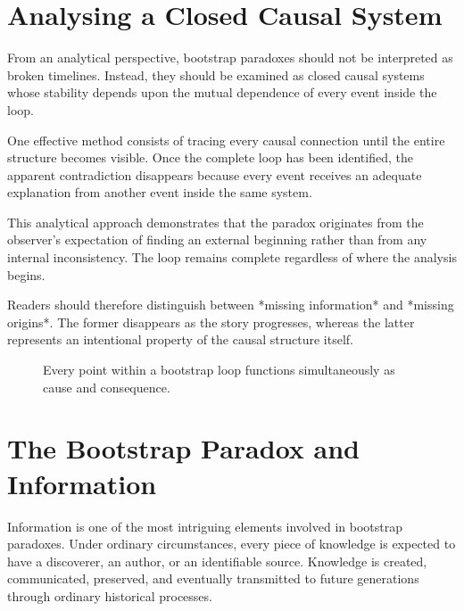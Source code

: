 \documentclass[12pt,oneside,openany]{book}
\begin{document}
\section{Analysing a Closed Causal System}

From an analytical perspective, bootstrap paradoxes should not be interpreted
as broken timelines. Instead, they should be examined as closed causal systems
whose stability depends upon the mutual dependence of every event inside the
loop.

One effective method consists of tracing every causal connection until the
entire structure becomes visible. Once the complete loop has been identified,
the apparent contradiction disappears because every event receives an adequate
explanation from another event inside the same system.

This analytical approach demonstrates that the paradox originates from the
observer's expectation of finding an external beginning rather than from any
internal inconsistency. The loop remains complete regardless of where the
analysis begins.

Readers should therefore distinguish between *missing information* and
*missing origins*. The former disappears as the story progresses, whereas the
latter represents an intentional property of the causal structure itself.

\begin{figure}[H]
\centering
{}
\caption{Every point within a bootstrap loop functions simultaneously as cause and consequence.}
\end{figure}
\section{The Bootstrap Paradox and Information}

Information is one of the most intriguing elements involved in bootstrap
paradoxes. Under ordinary circumstances, every piece of knowledge is expected
to have a discoverer, an author, or an identifiable source. Knowledge is
created, communicated, preserved, and eventually transmitted to future
generations through ordinary historical processes.
\end{document}
